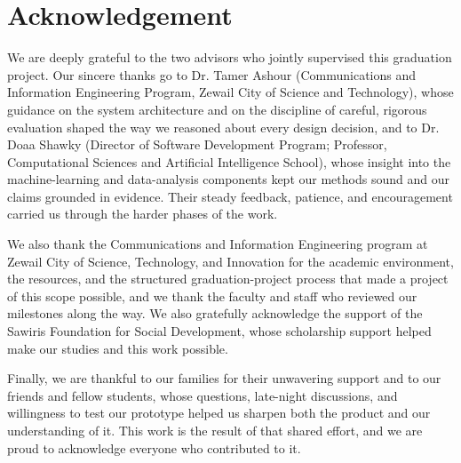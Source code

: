 \chapter*{Acknowledgement}

We are deeply grateful to the two advisors who jointly supervised this
graduation project. Our sincere thanks go to Dr. Tamer Ashour
(Communications and Information Engineering Program, Zewail City of Science and
Technology), whose guidance on the system architecture and on the
discipline of careful, rigorous evaluation shaped the way we reasoned about
every design decision, and to Dr. Doaa Shawky (Director of Software Development
Program; Professor, Computational Sciences and Artificial Intelligence School), whose
insight into the machine-learning and data-analysis components kept our
methods sound and our claims grounded in evidence. Their steady feedback,
patience, and encouragement carried us through the harder phases of the work.

We also thank the Communications and Information Engineering program at
Zewail City of Science, Technology, and Innovation for the academic
environment, the resources, and the structured graduation-project process
that made a project of this scope possible, and we thank the faculty and
staff who reviewed our milestones along the way. We also gratefully acknowledge
the support of the Sawiris Foundation for Social Development, whose scholarship
support helped make our studies and this work possible.

Finally, we are thankful to our families for their unwavering support and
to our friends and fellow students, whose questions, late-night discussions,
and willingness to test our prototype helped us sharpen both the product and
our understanding of it. This work is the result of that shared effort, and
we are proud to acknowledge everyone who contributed to it.

\clearpage
